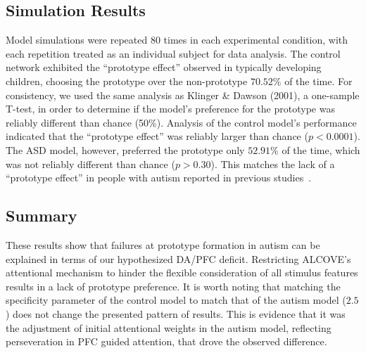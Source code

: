 \subsection{Simulation Results}
Model simulations were repeated $80$ times in each experimental condition, with each repetition treated as an individual subject for data analysis. The control network exhibited the ``prototype effect'' observed in typically developing children, choosing the prototype over the non-prototype $70.52\%$ of the time.
For consistency, we used the same analysis as Klinger \& Dawson (2001), a one-sample T-test, in order to determine if the model's preference for the prototype was reliably different than chance (50\%). Analysis of the control model's performance indicated that the ``prototype effect'' was reliably larger than chance ($p < 0.0001$). The ASD model, however, preferred the prototype only $52.91\%$ of the time, which was not reliably different than chance ($p > 0.30$). This matches the lack of a ``prototype effect'' in people with autism reported in previous studies~\cite{KlingerLG:2001:Prototype,GastgebHZ:2009:Prototype}.


\subsection{Summary}
These results show that failures at prototype formation in autism can be explained in terms of our hypothesized DA/PFC deficit. Restricting ALCOVE's attentional mechanism to hinder the flexible consideration of all stimulus features results in a lack of prototype preference. It is worth noting that matching the specificity parameter of the control model to match that of the autism model ($2.5$) does not change the presented pattern of results. This is evidence that it was the adjustment of initial attentional weights in the autism model, reflecting perseveration in PFC guided attention, that drove the observed difference.

